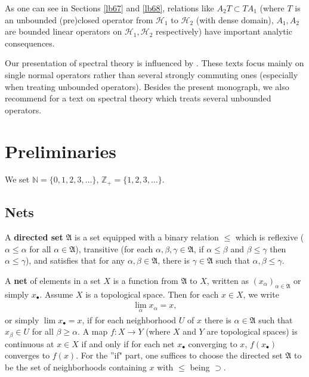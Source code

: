 \documentclass[12pt,a4paper,notitlepage]{article}
\theoremstyle{definition}
\theoremstyle{plain}
\newcommand{\fk}{\mathfrak}
\newcommand{\mc}{\mathcal}
\newcommand{\ovl}{\overline}
\newcommand{\blt}{\bullet}
\newcommand{\Cbb}{\mathbb C}
\newcommand{\Nbb}{\mathbb N}
\newcommand{\Zbb}{\mathbb Z}
\numberwithin{equation}{section}
\begin{document}
As one can see in Sections \ref{lb67} and \ref{lb68}, relations like $A_2T\subset TA_1$ (where $T$ is an unbounded (pre)closed operator from $\mc H_1$ to $\mc H_2$ (with dense domain), $A_1,A_2$ are bounded linear operators on $\mc H_1,\mc H_2$ respectively) have important analytic consequences.

Our presentation of spectral theory is influenced by \cite{Kad,RS,Rud-F}. These texts focus mainly on single normal operators rather than several strongly commuting ones (especially when treating unbounded operators). Besides the present monograph, we also recommend \cite{Sch} for a text on spectral theory which treats several unbounded operators.







\section{Preliminaries}\label{lb63}

We set $\Nbb=\{0,1,2,3,\dots\}$, $\Zbb_+=\{1,2,3,\dots\}$. 


\subsection*{Nets}

A \textbf{directed set} $\fk A$ is a set equipped with a binary relation $\leq$ which is reflexive ($\alpha\leq \alpha$ for all $\alpha\in\fk A$), transitive (for each $\alpha,\beta,\gamma\in\fk A$, if $\alpha\leq \beta$ and $\beta\leq\gamma$ then $\alpha\leq\gamma$), and satisfies that for any $\alpha,\beta\in\fk A$, there is $\gamma\in\fk A$ such that $\alpha,\beta\leq\gamma$.

A \textbf{net} of elements in a set $X$ is a function from $\fk A$ to $X$, written as $(x_\alpha)_{\alpha\in\fk A}$ or simply $x_\blt$. Assume $X$ is a topological space. Then for each $x\in X$, we write
\begin{align}
\lim_\alpha x_\alpha=x,	
\end{align}
or simply $\lim x_\blt=x$, if for each neighborhood $U$ of $x$ there is $\alpha\in\fk A$ such that $x_\beta\in U$ for all $\beta\geq \alpha$. A map $f:X\rightarrow Y$ (where $X$ and $Y$ are topological spaces) is continuous at $x\in X$ if and only if for each net $x_\blt$ converging to $x$, $f(x_\blt)$ converges to $f(x)$. For the ''if" part, one suffices to choose the directed set $\fk A$ to be the set of neighborhoods containing $x$ with $\leq$ being $\supset$.
\end{document}
